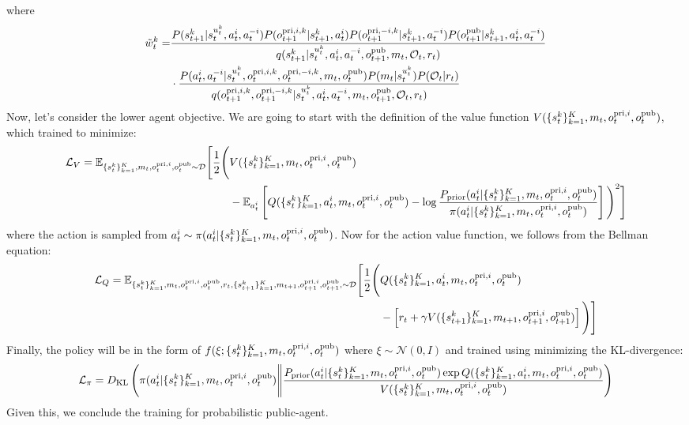 where 
\begin{equation}
\begin{aligned}
    \tilde{w}_t^k = &\frac{P(s_{t+1}^k | s_t^{u^k_t}, a_t^i, a_t^{-i})P(o^{\operatorname{pri}, i, k}_{t+1} | s_{t+1}^k, a^i_t) P(o^{\operatorname{pri}, -i, k}_{t+1} | s_{t+1}^k, a^{-i}_t) P(o^{\operatorname{pub}}_{t+1} | s_{t+1}^k, a^i_t, a^{-i}_t)}{q(s_{t+1}^k | s_t^{u^k_t}, a^i_t, a^{-i}_t, o^{\operatorname{pub}}_{t+1}, m_t, \mathcal{O}_t, r_t)} \\
    &\cdot \frac{P(a^i_t, a^{-i}_t | s_t^{u^k_t}, o^{\operatorname{pri}, i, k}_t, o^{\operatorname{pri}, -i, k}_t, m_t, o^{\operatorname{pub}}_t) P(m_t | s_t^{u^k_t}) P(\mathcal{O}_t | r_t)}{q(o^{\operatorname{pri}, i, k}_{t+1}, o^{\operatorname{pri}, -i, k}_{t+1} | s_t^{u^k_t}, a^i_t, a^{-i}_t, m_t, o^{\operatorname{pub}}_{t+1}, \mathcal{O}_t, r_t)} 
\end{aligned}
\end{equation}
Now, let's consider the lower agent objective. We are going to start with the definition of the value function $V(\{s_t^k\}^K_{k=1}, m_t, o^{\operatorname{pri}, i}_t, o^{\operatorname{pub}}_t)$, which trained to minimize:
\begin{equation}
\begin{aligned}
\mathcal{L}_{V} = \mathbb{E}_{\{s_t^k\}^K_{k=1}, m_t, o^{\operatorname{pri}, i}_t, o^{\operatorname{pub}}_t\sim \mathcal{D}} \Bigg[\frac{1}{2}\Bigg(&V(\{s_t^k\}^K_{k=1}, m_t, o^{\operatorname{pri}, i}_t, o^{\operatorname{pub}}_t) \\
&- \mathbb{E}_{a_t^i}\left[ Q(\{s_t^k\}^K_{k=1}, a^i_t, m_t, o^{\operatorname{pri}, i}_t, o^{\operatorname{pub}}_t) - \log \frac{P_{\text{prior}}(a^i_t | \{s_t^k\}^K_{k=1}, m_t, o^{\operatorname{pri}, i}_t, o^{\operatorname{pub}}_t)}{\pi(a^i_t | \{s_t^k\}^K_{k=1}, m_t, o^{\operatorname{pri}, i}_t, o^{\operatorname{pub}}_t)} \right]\Bigg)^2\Bigg]
\end{aligned}
\end{equation}
where the action is sampled from $a^i_t \sim \pi(a^i_t | \{s_t^k\}^K_{k=1}, m_t, o^{\operatorname{pri}, i}_t, o^{\operatorname{pub}}_t)$. Now for the action value function, we follows from the Bellman equation:
\begin{equation}
\begin{aligned}
    \mathcal{L}_Q = \mathbb{E}_{\{s_t^k\}^K_{k=1}, m_t, o^{\operatorname{pri}, i}_t, o^{\operatorname{pub}}_t, r_t, \{s_{t+1}^k\}^K_{k=1},m_{t+1}, o^{\operatorname{pri}, i}_{t+1}, o^{\operatorname{pub}}_{t+1},\sim \mathcal{D}}\Bigg[\frac{1}{2}\Bigg( &Q(\{s_t^k\}^K_{k=1}, a^i_t, m_t, o^{\operatorname{pri}, i}_t, o^{\operatorname{pub}}_t)  \\
    &- \left[ r_t + \gamma V(\{s_{t+1}^k\}^K_{k=1}, m_{t+1}, o^{\operatorname{pri}, i}_{t+1}, o^{\operatorname{pub}}_{t+1}) \right] \Bigg)\Bigg]
\end{aligned}
\end{equation}
Finally, the policy will be in the form of $f(\xi ; \{s_t^k\}^K_{k=1}, m_t, o^{\operatorname{pri}, i}_t, o^{\operatorname{pub}}_t)$ where $\xi \sim \mathcal{N}(0, I)$ and trained using minimizing the KL-divergence:
\begin{equation}
    \mathcal{L}_{\pi} = D_{\mathrm{KL}}\left( \pi(a^i_t | \{s_t^k\}^K_{k=1}, m_t, o^{\operatorname{pri}, i}_t, o^{\operatorname{pub}}_t)\Bigg\|\frac{P_{\text{prior}}(a^i_t | \{s_t^k\}^K_{k=1}, m_t, o^{\operatorname{pri}, i}_t, o^{\operatorname{pub}}_t)\exp{Q(\{s_t^k\}^K_{k=1}, a^i_t, m_t, o^{\operatorname{pri}, i}_t, o^{\operatorname{pub}}_t)}}{V(\{s_t^k\}^K_{k=1}, m_t, o^{\operatorname{pri}, i}_t, o^{\operatorname{pub}}_t)} \right)
\end{equation}
Given this, we conclude the training for probabilistic public-agent.
    
